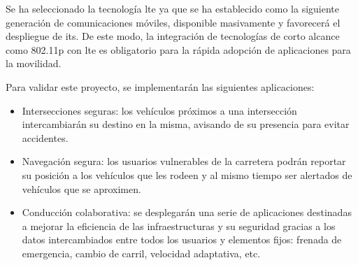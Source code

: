 Se ha seleccionado la tecnología \gls{lte} ya que se ha establecido como la siguiente generación de
comunicaciones móviles, disponible masivamente y favorecerá el despliegue de \gls{its}. De este modo,
la integración de tecnologías de corto alcance como \Gls{802.11p} con \gls{lte} es obligatorio para la
rápida adopción de aplicaciones para la movilidad.

Para validar este proyecto, se implementarán las siguientes aplicaciones:
\begin{itemize}
	\item Intersecciones seguras: los vehículos próximos a una intersección intercambiarán su destino en
	la misma, avisando de su presencia para evitar accidentes.

	\item Navegación segura: los usuarios vulnerables de la carretera podrán reportar su posición a los
	vehículos que les rodeen y al mismo tiempo ser alertados de vehículos que se aproximen.

	\item Conducción colaborativa: se desplegarán una serie de aplicaciones destinadas a mejorar la eficiencia
	de las infraestructuras y su seguridad gracias a los datos intercambiados entre todos los usuarios y elementos
	fijos: frenada de emergencia, cambio de carril, velocidad adaptativa, etc.
\end{itemize}
